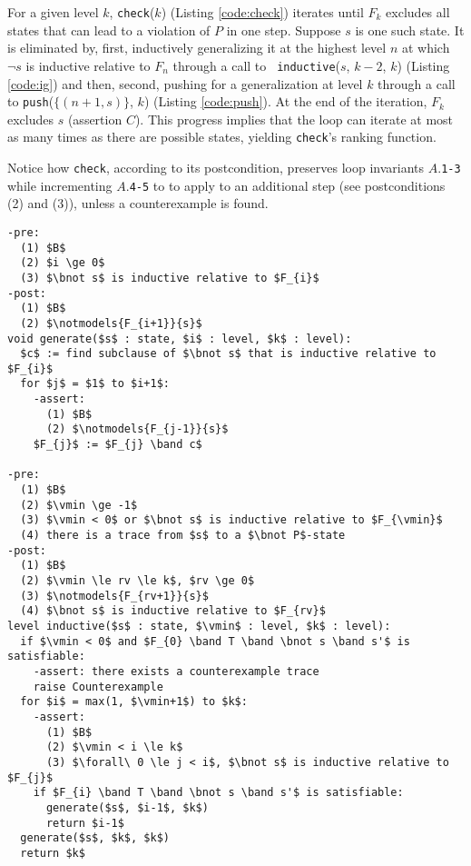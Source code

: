 \documentclass{llncs}
\newcommand{\set}[1]{ \{ #1 \} }
\newcommand{\band}{\wedge}
\newcommand{\bnot}{\neg}
\begin{document}
For a given level $k$, {\tt check}($k$) (Listing \ref{code:check})
iterates until $F_{k}$ excludes all states that can lead to a violation
of $P$ in one step.  Suppose $s$ is one such state.  It is eliminated
by, first, inductively generalizing it at the highest level $n$ at
which $\bnot s$ is inductive relative to $F_{n}$ through a call to {\tt
  inductive}($s$, $k-2$, $k$) (Listing \ref{code:ig}) and then,
second, pushing for a generalization at level $k$ through a call to
{\tt push}($\set{(n+1, s)}$, $k$) (Listing \ref{code:push}).  At the
end of the iteration, $F_{k}$ excludes $s$ (assertion $C$).  This
progress implies that the loop can iterate at most as many times as
there are possible states, yielding {\tt check}'s ranking function.

Notice how {\tt check}, according to its postcondition, preserves loop
invariants $A$.{\tt 1-3} while incrementing $A$.{\tt 4-5} to to apply
to an additional step (see postconditions (2) and (3)), unless a
counterexample is found.

\begin{lstlisting}[name=code,caption={$i$-step relative inductive generalization},label=code:ig,float=tb]
-pre:  
  (1) $B$
  (2) $i \ge 0$
  (3) $\bnot s$ is inductive relative to $F_{i}$
-post: 
  (1) $B$
  (2) $\notmodels{F_{i+1}}{s}$
void generate($s$ : state, $i$ : level, $k$ : level):
  $c$ := find subclause of $\bnot s$ that is inductive relative to $F_{i}$
  for $j$ = $1$ to $i+1$:
    -assert: 
      (1) $B$
      (2) $\notmodels{F_{j-1}}{s}$
    $F_{j}$ := $F_{j} \band c$

-pre:  
  (1) $B$
  (2) $\vmin \ge -1$
  (3) $\vmin < 0$ or $\bnot s$ is inductive relative to $F_{\vmin}$
  (4) there is a trace from $s$ to a $\bnot P$-state
-post: 
  (1) $B$
  (2) $\vmin \le rv \le k$, $rv \ge 0$
  (3) $\notmodels{F_{rv+1}}{s}$
  (4) $\bnot s$ is inductive relative to $F_{rv}$
level inductive($s$ : state, $\vmin$ : level, $k$ : level):
  if $\vmin < 0$ and $F_{0} \band T \band \bnot s \band s'$ is satisfiable:
    -assert: there exists a counterexample trace
    raise Counterexample
  for $i$ = max(1, $\vmin+1$) to $k$:
    -assert: 
      (1) $B$
      (2) $\vmin < i \le k$
      (3) $\forall\ 0 \le j < i$, $\bnot s$ is inductive relative to $F_{j}$
    if $F_{i} \band T \band \bnot s \band s'$ is satisfiable:
      generate($s$, $i-1$, $k$)
      return $i-1$
  generate($s$, $k$, $k$)
  return $k$
\end{lstlisting}
\end{document}
